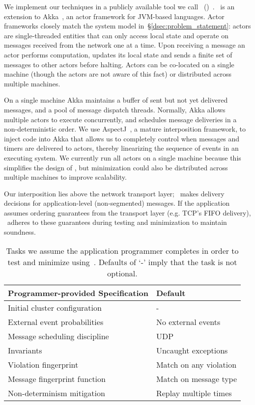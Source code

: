 We implement our techniques in a publicly available tool we call \sys~(\system)~\cite{our_repo}. \sys~is an extension
to Akka~\cite{akka}, an actor
framework for JVM-based languages.
Actor frameworks closely match the system model in~\S\ref{dsec:problem_statement}: actors
are single-threaded entities that can only access local state and operate on messages
received from the network one at a time. Upon receiving a message an actor performs computation,
updates its local state and sends a finite set of messages to other actors
before halting. Actors can be co-located
on a single machine (though the actors are not aware of this fact) or distributed across multiple machines.

On a single machine Akka maintains a buffer of sent but not yet delivered
messages, and a pool of message dispatch threads.
Normally, Akka allows multiple actors to execute
concurrently, and schedules message deliveries in a
non-deterministic order. We use AspectJ~\cite{kiczales2001overview}, a mature interposition framework,
to inject code into Akka that allows us to completely control when messages
and timers are
delivered to actors, thereby linearizing the sequence of events in an executing system.
We currently run all actors on a single machine because this simplifies the
design of \sys,
but minimization could also be distributed across multiple machines to improve
scalability.

Our interposition lies above the network transport layer; \sys~makes
delivery decisions for application-level (non-segmented) messages.
If the application assumes ordering guarantees from the transport
layer (e.g. TCP's FIFO delivery), \sys~adheres to these guarantees
during testing and minimization to maintain soundness.

\begin{table}[tb]
\centering
\footnotesize
\begin{tabular}{l|l}
\textbf{Programmer-provided Specification} & \textbf{Default} \\
\hline
Initial cluster configuration & - \\
External event probabilities & No external events \\
Message scheduling discipline & UDP \\
Invariants & Uncaught exceptions \\
Violation fingerprint & Match on any violation \\
Message fingerprint function & Match on message type \\
Non-determinism mitigation & Replay multiple times
\end{tabular}
\caption{\label{tab:programmer_tasks} Tasks we assume the application
programmer completes in order to test and minimize using~\sys. Defaults
of `-' imply that the task is not optional.}
\end{table}

